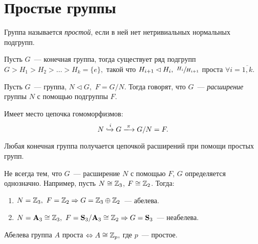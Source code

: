 \newpage
        \section{Простые группы}
        \setcounter{definition}{0}
        \begin{definition}
            Группа называется \textit{простой}, если в ней нет нетривиальных нормальных подгрупп.
        \end{definition}
        \begin{theorem}
            Пусть $G$~--- конечная группа, тогда существует ряд подгрупп ${G > H_1 > H_2 > \ldots > H_k = \{e\},}$ такой что ${H_{i + 1} \lhd H_i, \ \sfrac{H_i}{H_{i+1}}}$ проста ${\forall i = \overline{1,k}.}$
        \end{theorem}
        \begin{definition}
            Пусть $G$~--- группа, ${N \lhd G,}$ ${F = G/N.}$ Тогда говорят, что $G$~--- \textit{расширение} группы $N$ с помощью подгруппы $F$.
        \end{definition}
        \begin{remark}
            Имеет место цепочка гомоморфизмов:
            \begin{equation*}
                N \xhookrightarrow{i} G \xlongrightarrow{\pi} G/N = F.
            \end{equation*}
        \end{remark}
        \begin{consequence*}
            Любая конечная группа получается цепочкой расширений при помощи простых групп.
        \end{consequence*}
        \begin{exmpls}
            Не всегда тем, что $G$~--- расширение $N$ с помощью $F$, $G$ определяется однозначно. Например, пусть ${N \cong \mathbb{Z}_3}$, ${F \cong \mathbb{Z}_2}$. Тогда: 
            \begin{enumerate}
            \setlength\itemsep{0.1em}
                \item ${N = \mathbb{Z}_3, \ F = \mathbb{Z}_2 \Rightarrow G = \mathbb{Z}_3 \oplus \mathbb{Z}_2}$~--- абелева.
                \item ${N = \mathbf{A}_3 \cong \mathbb{Z}_3, \ F = \mathbf{S}_3/\mathbf{A}_3 \cong \mathbb{Z}_2 \Rightarrow G = \mathbf{S}_3}$~--- неабелева.
            \end{enumerate}
        \end{exmpls}
        \begin{remark}
            Абелева группа $A$ проста ${\Leftrightarrow A \cong \mathbb{Z}_p,}$ где $p$~--- простое.
        \end{remark}
